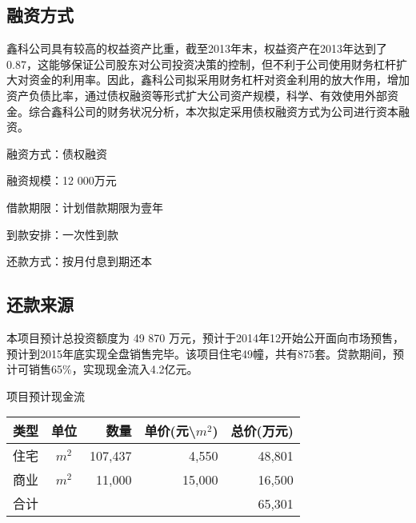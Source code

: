 \subsection{融资方式}
鑫科公司具有较高的权益资产比重，截至2013年末，权益资产在2013年达到了0.87，这能够保证公司股东对公司投资决策的控制，但不利于公司使用财务杠杆扩大对资金的利用率。因此，鑫科公司拟采用财务杠杆对资金利用的放大作用，增加资产负债比率，通过债权融资等形式扩大公司资产规模，科学、有效使用外部资金。综合鑫科公司的财务状况分析，本次拟定采用债权融资方式为公司进行资本融资。
\begin{compactitem}
\item 融资方式：债权融资
\item 融资规模：12 000万元
\item 借款期限：计划借款期限为壹年
\item 到款安排：一次性到款
\item 还款方式：按月付息到期还本
\end{compactitem}


\subsection{还款来源}
本项目预计总投资额度为 49 870 万元，预计于2014年12开始公开面向市场预售，预计到2015年底实现全盘销售完毕。该项目住宅49幢，共有875套。贷款期间，预计可销售65\%，实现现金流入4.2亿元。
  \begin{center}
  \begin{threeparttable}\vspace{-1.0cm}
 \caption{项目预计现金流}
 \renewcommand{\arraystretch}{1.1} \arrayrulewidth=0.8pt \tabcolsep=8pt
 	 \begin{tabular}{>{\footnotesize}c>{\footnotesize}c>{\footnotesize}r>{\footnotesize}r>{\footnotesize}r}
	\hline\hline
\rowcolor{mycyan}	\bfseries 类型 	& \bfseries 单位   &  \bfseries 数量 \hspace{2ex}      & \bfseries 单价(元\textbackslash $m^2$) & \bfseries 总价(万元)  \\
	\hline \renewcommand{\arraystretch}{1}
住宅	&	$m^2$	& 107,437	&	4,550	&	48,801	\\
商业	&	$m^2$	&	11,000	&	15,000	&	 16,500	\\
\midrule
合计	&		&		&		&	65,301	\\	
	\bottomrule
	\end{tabular}
\end{threeparttable}
\end{center}

